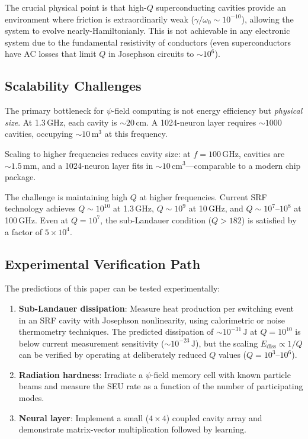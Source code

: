 \documentclass[11pt,twocolumn]{article}
\theoremstyle{definition}
\theoremstyle{remark}
\begin{document}
The crucial physical point is that high-$Q$ superconducting cavities
provide an environment where friction is extraordinarily weak
($\gamma/\omega_0 \sim 10^{-10}$), allowing the system to evolve
nearly-Hamiltonianly. This is not achievable in any electronic system
due to the fundamental resistivity of conductors (even superconductors
have AC losses that limit $Q$ in Josephson circuits to $\sim 10^6$).

\subsection{Scalability Challenges}

The primary bottleneck for $\psi$-field computing is not energy
efficiency but \emph{physical size}. At 1.3\,GHz, each cavity is
$\sim 20\,\mathrm{cm}$. A 1024-neuron layer requires $\sim 1000$
cavities, occupying $\sim 10\,\mathrm{m}^3$ at this frequency.

Scaling to higher frequencies reduces cavity size: at $f = 100\,\mathrm{GHz}$,
cavities are $\sim 1.5\,\mathrm{mm}$, and a 1024-neuron layer fits in
$\sim 10\,\mathrm{cm}^3$---comparable to a modern chip package.

The challenge is maintaining high $Q$ at higher frequencies. Current
SRF technology achieves $Q \sim 10^{10}$ at 1.3\,GHz, $Q \sim 10^9$ at
10\,GHz, and $Q \sim 10^7$--$10^8$ at 100\,GHz. Even at $Q = 10^7$, the
sub-Landauer condition ($Q > 182$) is satisfied by a factor of $5\times 10^4$.

\subsection{Experimental Verification Path}

The predictions of this paper can be tested experimentally:
\begin{enumerate}
\item \textbf{Sub-Landauer dissipation}: Measure heat production per
switching event in an SRF cavity with Josephson nonlinearity, using
calorimetric or noise thermometry techniques. The predicted dissipation
of $\sim 10^{-31}\,\mathrm{J}$ at $Q = 10^{10}$ is below current
measurement sensitivity ($\sim 10^{-23}\,\mathrm{J}$), but the scaling
$E_{\mathrm{diss}} \propto 1/Q$ can be verified by operating at
deliberately reduced $Q$ values ($Q = 10^3$--$10^6$).
\item \textbf{Radiation hardness}: Irradiate a $\psi$-field memory cell
with known particle beams and measure the SEU rate as a function of the
number of participating modes.
\item \textbf{Neural layer}: Implement a small ($4 \times 4$) coupled
cavity array and demonstrate matrix-vector multiplication followed by
learning.
\end{enumerate}
\end{document}
